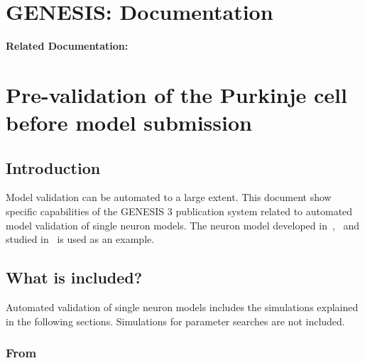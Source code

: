 \documentclass[12pt]{article}
\begin{document}
\section*{GENESIS: Documentation}

{\bf Related Documentation:}

\section*{Pre-validation of the Purkinje cell before model submission}

\subsection*{Introduction}

Model validation can be automated to a large extent.  This document
show specific capabilities of the GENESIS 3 publication system related
to automated model validation of single neuron models.  The neuron
model developed in~\cite{De-Schutter-E:1994vn},~\cite{E:1994hc} and
studied in~\cite{schutter94:_simul_purkin} is used as an example.

\subsection*{What is included?}

Automated validation of single neuron models includes the simulations
explained in the following sections.  Simulations for parameter
searches are not included.


\subsubsection*{From~\cite{De-Schutter-E:1994vn}}
\end{document}
